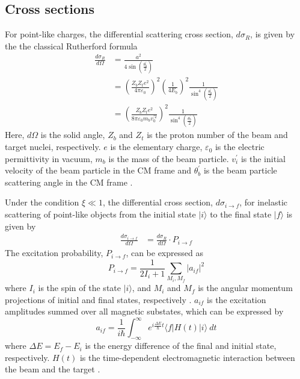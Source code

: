 \documentclass[twoside,english]{uiofysmaster/uiofysmaster}
\begin{document}
\subsection{Cross sections}
For point-like charges, the differential scattering cross section, $d\sigma_R$, is given by the the classical Rutherford formula
\begin{align}
	\frac{d\sigma_R}{d\Omega} 
	&= \frac{a^2}{4 \sin \left( \tfrac{\theta_b^{'}}{2} \right)} \nonumber \\
	&= \left( \frac{Z_b Z_t e^2}{4\pi \varepsilon_0}  \right)^2 \left( \frac{1}{4 E_b}  \right)^2 \frac{1}{\sin^4 \left( \frac{\theta_b^{'}}{2} \right)} \nonumber \\	
	&= \left( \frac{Z_b Z_t e^2}{8 \pi \varepsilon_0 m_b v_0^{' 2}} \right)^2 \frac{1}{\sin^4 \left( \frac{\theta_b^{'}}{2} \right)} 
\end{align}
Here, $d\Omega$ is the solid angle, $Z_b$ and $Z_t$ is the proton number of the beam and target nuclei, respectively. 
$e$ is the elementary charge, $\varepsilon_0$ is the electric permittivity in vacuum, $m_b$ is the mass of the beam particle. 
$v_i^{'}$ is the initial velocity of the beam particle in the CM frame and $\theta_b^{'}$ is the beam particle scattering angle in the CM frame \cite{Klintefjord, Krane, EE-Coulex}.

Under the condition $\xi \ll 1$, the differential cross section, $d\sigma_{i \rightarrow f}$, for inelastic scattering of point-like objects from the initial state $|i\rangle$ to the final state $|f\rangle$ is given by 
\begin{align}
	\frac{d\sigma_{i \rightarrow f}}{d\Omega} 
	&= \frac{d\sigma_R}{d\Omega} \cdot P_{i \rightarrow f} 
\end{align}
The excitation probability, $P_{i \rightarrow f}$, can be expressed as
\begin{equation}
	P_{i \rightarrow f} = \frac{1}{2I_i + 1} \sum_{M_i, M_f} | a_{if} |^2
\end{equation}
where $I_i$ is the spin of the state $|i\rangle$, and $M_i$ and $M_f$ is the angular momentum projections of initial and final states, respectively \cite{EE-Coulex, NaR}.
$a_{if}$ is the excitation amplitudes summed over all magnetic substates, which can be expressed by
\begin{equation}
	a_{if} = \frac{1}{i\hbar} \int_{-\infty}^{\infty} e^{i \frac{\Delta E}{\hbar} t} \langle f | H(t) | i \rangle ~dt
\end{equation}
where $\Delta E = E_f - E_i$ is the energy difference of the final and initial state, respectively. 
$H(t)$ is the time-dependent electromagnetic interaction between the beam and the target \cite{Klintefjord, Niedermaier, NaR}.
\end{document}
